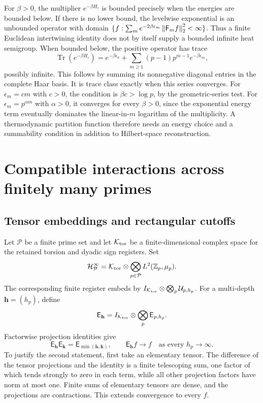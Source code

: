For $\beta>0$, the multiplier $e^{-\beta H_\epsilon}$ is bounded precisely
when the energies are bounded below. If there is no lower bound, the
levelwise exponential is an unbounded operator with domain
$\{f:\sum_m e^{-2\beta\epsilon_m}\left\lVert\mathsf F_mf\right\rVert_2^2<\infty\}$.
Thus a finite Euclidean intertwining identity does not by itself supply a
bounded infinite heat semigroup.
When bounded below, the positive operator has trace
\begin{equation}
 \operatorname{Tr}(e^{-\beta H_\epsilon})
 =e^{-\beta\epsilon_0}
 +\sum_{m\geq1}(p-1)p^{m-1}e^{-\beta\epsilon_m},
 \label{a-limit-thermal-trace}
\end{equation}
possibly infinite. This follows by summing its nonnegative diagonal
entries in the complete Haar basis. It is trace class exactly when this
series converges. For $\epsilon_m=c m$ with $c>0$, the condition is
$\beta c>\log p$, by the geometric-series test. For
$\epsilon_m=p^{\alpha m}$ with $\alpha>0$, it converges for every
$\beta>0$, since the exponential energy term eventually dominates the
linear-in-$m$ logarithm of the multiplicity. A thermodynamic partition
function therefore needs an energy choice and a summability condition in
addition to Hilbert-space reconstruction.


\section{Compatible interactions across finitely many primes}
\label{a-limit-multiprime}

\subsection{Tensor embeddings and rectangular cutoffs}

Let $\mathcal P$ be a finite prime set and let $\mathcal K_{\mathrm{tor}}$ be a
finite-dimensional complex space for the retained torsion and dyadic sign
registers. Set
\begin{equation}
 \mathcal H_{\mathcal P}^{\infty}
 =\mathcal K_{\mathrm{tor}}\otimes
 \bigotimes_{p\in\mathcal P}L^2(\mathbb Z_p,\mu_p).
 \label{a-limit-multiprime-space}
\end{equation}
The corresponding finite register embeds by
$I_{\mathcal K_{\mathrm{tor}}}\otimes\bigotimes_p\mathcal U_{p,h_p}$.
For a multi-depth $\mathbf h=(h_p)$, define
\[
 \mathsf E_{\mathbf h}
 =I_{\mathcal K_{\mathrm{tor}}}\otimes\bigotimes_p\mathsf E_{p,h_p}.
\]
Factorwise projection identities give
\begin{equation}
 \mathsf E_{\mathbf h}\mathsf E_{\mathbf k}
 =\mathsf E_{\min(\mathbf h,\mathbf k)},
 \qquad \mathsf E_{\mathbf h}f\to f
 \quad\text{as every }h_p\to\infty.
 \label{a-limit-rectangular-projections}
\end{equation}
To justify the second statement, first take an elementary tensor. The
difference of the tensor projections and the identity is a finite
telescoping sum, one factor of which tends strongly to zero in each term,
while all other projection factors have norm at most one. Finite sums of
elementary tensors are dense, and the projections are contractions. This
extends convergence to every $f$.

